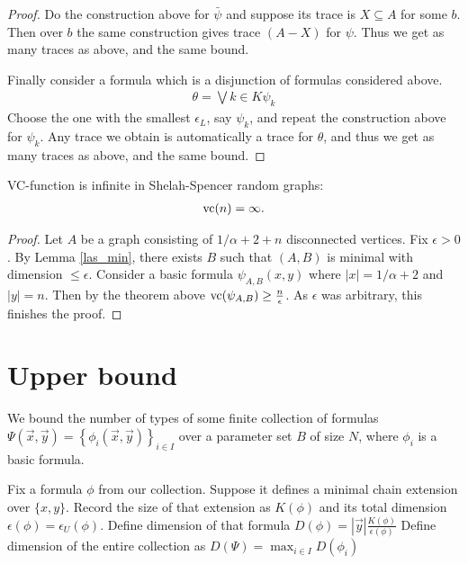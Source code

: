 \documentclass{amsart}
\newcommand{\curly}[1]{\left\{#1\right\}}
\begin{document}
\begin{proof}
  Do the construction above for $\bar \psi$ and suppose its trace is $X \subseteq A$ for some $b$.
  Then over $b$ the same construction gives trace $(A - X)$ for $\psi$. Thus we get as many traces as above, and the same bound.
  
  Finally consider a formula which is a disjunction of formulas considered above.
  \begin{align*}
    \theta = \bigvee{k \in K} \psi_k
  \end{align*}
  Choose the one with the smallest $\epsilon_L$, say $\psi_k$, and repeat the construction above for $\psi_k$.
  Any trace we obtain is automatically a trace for $\theta$, and thus we get as many traces as above, and the same bound.
\end{proof}

\begin{Corollary}
  VC-function is infinite in Shelah-Spencer random graphs:
  \begin{align*}
    \operatorname{vc}(n) = \infty.
  \end{align*}
\end{Corollary}

\begin{proof}
  Let $A$ be a graph consisting of $1/\alpha + 2 + n$ disconnected vertices.
  Fix $\epsilon > 0$.
  By Lemma \ref{las_min}, there exists $B$ such that $(A, B)$ is minimal with dimension $\leq \epsilon$.
  Consider a basic formula $\psi_{A, B}(x, y)$ where $|x| = 1/\alpha + 2$ and $|y| = n$.
  Then by the theorem above $\operatorname{vc} (\psi_{A,B}) \geq \frac{n}{\epsilon}$.
  As $\epsilon$ was arbitrary, this finishes the proof.
\end{proof}



\section{Upper bound}

We bound the number of types of some finite collection of formulas $\Psi(\vec x, \vec y) = \curly{\phi_i(\vec x, \vec y)}_{i\in I}$ over a parameter set $B$ of size $N$,
where $\phi_i$ is a basic formula.

Fix a formula $\phi$ from our collection.
Suppose it defines a minimal chain extension over $\{x, y\}$. 
Record the size of that extension as $K(\phi)$ and its total dimension $\epsilon(\phi) = \epsilon_U(\phi)$.
Define dimension of that formula $D(\phi) = |\vec y| \frac{K(\phi)}{\epsilon(\phi)}$
Define dimension of the entire collection as $D(\Psi) = \max_{i \in I} D(\phi_i)$
\end{document}
